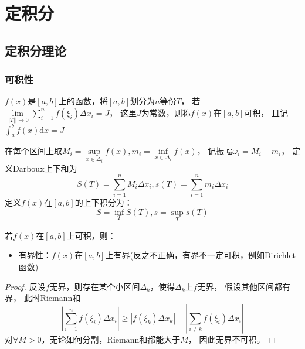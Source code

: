 
\chapter{定积分}

\section{定积分理论}

\subsection{可积性}

\begin{definition}[Riemann积分]
  $f(x)$是$[a,b]$上的函数，将$[a,b]$划分为$n$等份$T$，
  若$\lim \limits _{||T|| \rightarrow 0} \sum\limits_{i=1}^n f(\xi_i) \Delta x_i = J$，
  这里$J$为常数，则称$f(x)$在$[a,b]$可积，
  且记$\int_a^bf(x)\mathrm{d}x = J$
\end{definition}

\begin{definition}[Darboux上下和]
  在每个区间上取$M_i = \sup \limits _{x \in \Delta _i} f(x), m_i = \inf \limits_{x \in \Delta _i}f(x)$，
  记振幅$\omega_i = M_i - m_i$，
  定义Darboux上下和为
  \begin{equation*}
    S(T) = \sum\limits_{i = 1}^n M_i\Delta x_i, s(T) = \sum\limits_{i = 1}^n m_i\Delta x_i
  \end{equation*}
  定义$f(x)$在$[a,b]$的上下积分为：
  \begin{equation*}
    S = \inf \limits_T S(T), s = \sup \limits_T s(T)
  \end{equation*}
\end{definition}

\begin{theorem}[可积函数的性质]
  若$f(x)$在$[a,b]$上可积，则：
  \begin{itemize}
  \item 有界性：$f(x)$在$[a,b]$上有界(反之不正确，有界不一定可积，例如Dirichlet函数)
  \end{itemize}
\end{theorem}

\begin{proof}
  反设$f$无界，则存在某个小区间$\Delta_k$，使得$\Delta_k$上$f$无界，
  假设其他区间都有界，
  此时Riemann和
  \begin{equation*}
    |\sum\limits_{i = 1}^n f(\xi_i) \Delta x_i| \geq |f(\xi_k) \Delta x_k| - |\sum\limits_{i \neq k} f(\xi_i)\Delta x_i|
  \end{equation*}
  对$\forall M > 0$，无论如何分割，Riemann和都能大于$M$，
  因此无界不可积。
\end{proof}

